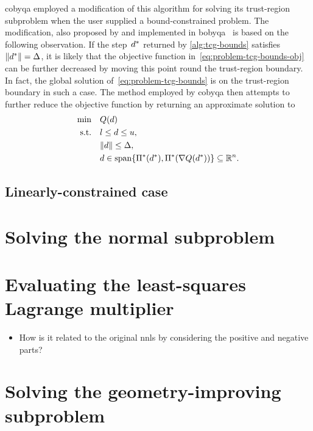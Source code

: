 \Gls{cobyqa} employed a modification of this algorithm for solving its trust-region subproblem when the user supplied a bound-constrained problem.
The modification, also proposed by \citeauthor{Powell_2009} and implemented in \gls{bobyqa}~\cite{Powell_2009} is based on the following observation.
If the step~$\step[\ast]$ returned by \cref{alg:tcg-bounds} satisfies~$\norm{\step[\ast]} = \rad$, it is likely that the objective function in~\cref{eq:problem-tcg-bounds-obj} can be further decreased by moving this point round the trust-region boundary.
In fact, the global solution of~\cref{eq:problem-tcg-bounds} is on the trust-region boundary in such a case.
The method employed by \gls{cobyqa} then attempts to further reduce the objective function by returning an approximate solution to
\begin{align*}
    \min        & \quad Q(\step)\\
    \text{s.t.} & \quad \xl \le \step \le \xu,\\
                & \quad \norm{\step} \le \rad,\\
                & \quad \step \in \spn \set{\Pi^{\ast}(\step[\ast]), \Pi^{\ast}(\nabla Q(\step[\ast]))} \subseteq \R^n.
\end{align*}

\subsection{Linearly-constrained case}

\section{Solving the normal subproblem}
\label{sec:cobyqa-normal}

\section{Evaluating the least-squares Lagrange multiplier}
\label{sec:cobyqa-lagrange-multipliers}

\begin{itemize}
    \item How is it related to the original \gls{nnls} by considering the positive and negative parts?
\end{itemize}

\section{Solving the geometry-improving subproblem}
\label{sec:cobyqa-geometry-improving}
